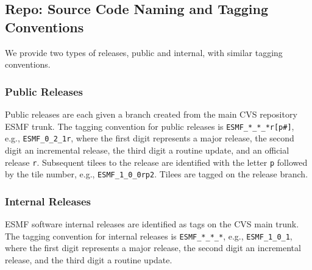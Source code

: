 
\subsection{Repo: Source Code Naming and Tagging Conventions}
\label{sec:tagging}

We provide two types of releases, public and internal, with similar tagging conventions.

\subsubsection{Public Releases}
Public releases are each given a branch created from the main CVS repository ESMF trunk. The tagging convention
for public releases is
{\tt ESMF\_*\_*\_*r[p\#]}, e.g., {\tt ESMF\_0\_2\_1r}, where the first digit represents a major release, the
second digit an incremental release, the third digit a routine update, and an official release {\tt r}.
Subsequent tilees to the release are identified with the letter {\tt p} followed by the tile number,
e.g., {\tt ESMF\_1\_0\_0rp2}. Tilees are tagged on the release branch.

\subsubsection{Internal Releases}
ESMF software internal releases are identified as tags on the CVS main trunk.
The tagging convention for internal releases is
{\tt ESMF\_*\_*\_*}, e.g., {\tt ESMF\_1\_0\_1}, where the first digit represents a
major release, the second digit an incremental release, and the third digit a routine update.

